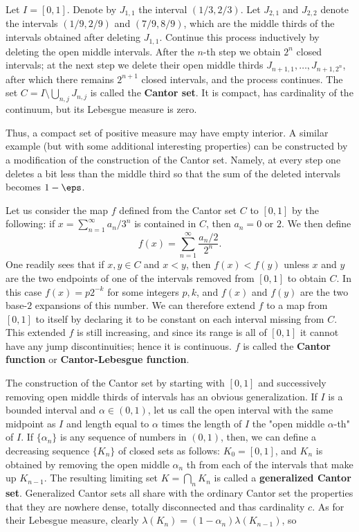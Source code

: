 \begin{example}\label{Cantor set function def}
Let $I=[0,1]$. Denote by $J_{1,1}$ the interval $(1/3,2/3)$. Let $J_{2,1}$ and $J_{2,2}$ denote the intervals $(1/9,2/9)$ and $(7/9,8/9)$, which are the middle thirds of the intervals obtained after deleting $J_{1,1}$. Continue this process inductively by deleting the open middle intervals. After the $n$-th step we obtain $2^n$ closed intervals; at the next step we delete their open middle thirds $J_{n+1,1},\dots,J_{n+1,2^n}$, after which there remains $2^{n+1}$ closed intervals, and the process continues. The set $C=I\setminus\bigcup_{n,j}J_{n,j}$ is called the \textbf{Cantor set}. It is compact, has cardinality of the continuum, but its Lebesgue measure is zero.\par
Thus, a compact set of positive measure may have empty interior. A similar example (but with some additional interesting properties) can be constructed by a modification of the construction of the Cantor set. Namely, at every step one deletes a bit less than the middle third so that the sum of the deleted intervals becomes $1-\eps$.\par
Let us consider the map $f$ defined from the Cantor set $C$ to $[0,1]$ by
the following: if $x=\sum_{n=1}^{\infty}a_n/3^n$ is contained in $C$, then $a_n=0$ or $2$. We then define 
\[f(x)=\sum_{n=1}^{\infty}\frac{a_n/2}{2^n}.\]
One readily sees that if $x,y\in C$ and $x<y$, then $f(x)<f(y)$ unless $x$ and $y$ are the two endpoints of one of the intervals removed from $[0,1]$ to obtain $C$. In this case $f(x)=p2^{-k}$ for some integers $p,k$, and $f( x)$ and $f(y)$ are the two base-$2$ expansions of this number. We can therefore extend $f$ to a map from $[0,1]$ to itself by declaring it to be constant on each interval missing from $C$. This extended $f$ is still increasing, and since its range is all of $[0,1]$ it cannot have any jump discontinuities; hence it is continuous. $f$ is called the \textbf{Cantor function} or \textbf{Cantor-Lebesgue function}.\par
The construction of the Cantor set by starting with $[0,1]$ and successively removing open middle thirds of intervals has an obvious generalization. If $I$ is a bounded interval and  $\alpha\in(0,1)$, let us call the open interval with the same midpoint as $I$ and length equal to $\alpha$ times the length of $I$ the "open middle $\alpha$-th" of $I$. If $\{\alpha_n\}$ is any sequence of numbers in $(0,1)$, then, we can define a decreasing sequence $\{K_n\}$ of closed sets as follows: $K_0=[0,1]$, and $K_n$ is obtained by removing the open middle $\alpha_n$ th from each of the intervals that make up $K_{n-1}$. The resulting limiting set $K=\bigcap_nK_n$ is called a \textbf{generalized Cantor set}. Generalized Cantor sets all share with the ordinary Cantor set the properties that they are nowhere dense, totally disconnected and thas cardinality $c$. As for their Lebesgue measure, clearly $\lambda(K_n)=(1-\alpha_n)\lambda(K_{n-1})$, so

\end{example}
